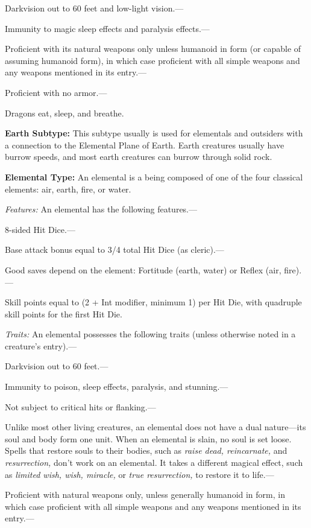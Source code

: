 \documentclass{article}
\begin{document}
Darkvision out to 60 feet and low-light vision.---

Immunity to magic sleep effects and paralysis effects.---

Proficient with its natural weapons only unless humanoid in form (or capable of 
assuming humanoid form), in which case proficient with all simple weapons and any 
weapons mentioned in its entry.---

Proficient with no armor.---

Dragons eat, sleep, and breathe.

\vspace{12pt}
\textbf{Earth Subtype:} This subtype usually is used for elementals and outsiders 
with a connection to the Elemental Plane of Earth. Earth creatures usually have 
burrow speeds, and most earth creatures can burrow through solid rock.

\vspace{12pt}
\textbf{Elemental Type:} An elemental is a being composed of one of the four classical 
elements: air, earth, fire, or water.

\textit{Features: }An elemental has the following features.---

8-sided Hit Dice.---

Base attack bonus equal to 3/4 total Hit Dice (as cleric).---

Good saves depend on the element: Fortitude (earth, water) or Reflex (air, fire).---

Skill points equal to (2 + Int modifier, minimum 1) per Hit Die, with quadruple 
skill points for the first Hit Die.

\textit{Traits: }An elemental possesses the following traits (unless otherwise 
noted in a creature's entry).---

Darkvision out to 60 feet.---

Immunity to poison, sleep effects, paralysis, and stunning.---

Not subject to critical hits or flanking.---

Unlike most other living creatures, an elemental does not have a dual nature---its 
soul and body form one unit. When an elemental is slain, no soul is set loose. 
Spells that restore souls to their bodies, such as \textit{raise dead, reincarnate, 
}and \textit{resurrection, }don't work on an elemental. It takes a different magical 
effect, such as \textit{limited wish, wish, miracle, }or \textit{true resurrection, 
}to restore it to life.---

Proficient with natural weapons only, unless generally humanoid in form, in which 
case proficient with all simple weapons and any weapons mentioned in its entry.---
\end{document}
